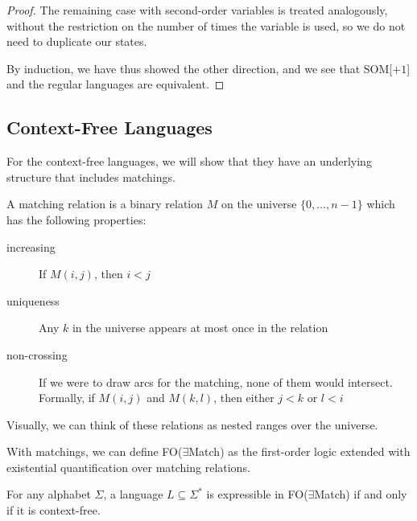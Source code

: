 \begin{proof}
    The remaining case with second-order variables is treated analogously, without the restriction on the number of times the variable is used, so we do not need to duplicate our states.

    By induction, we have thus showed the other direction, and we see that SOM[$+ 1$] and the regular languages are equivalent.
\end{proof}

\subsection{Context-Free Languages}\label{subsec:des-context-free-languages}

For the context-free languages, we will show that they have an underlying structure that includes matchings.

A matching relation is a binary relation $M$ on the universe $\{0, \dots, n - 1\}$ which has the following properties:
\begin{description}
    \item[increasing] If $M(i, j)$, then $i < j$
    \item[uniqueness] Any $k$ in the universe appears at most once in the relation
    \item[non-crossing] If we were to draw arcs for the matching, none of them would intersect.
    Formally, if $M(i, j)$ and $M(k, l)$, then either $j < k$ or $l < i$
\end{description}
Visually, we can think of these relations as nested ranges over the universe.

With matchings, we can define FO($\exists$Match) as the first-order logic extended with existential quantification over matching relations.

\begin{theorem}
    For any alphabet $\Sigma$, a language $L \subseteq \Sigma^{*}$ is expressible in FO($\exists$Match) if and only if it is context-free.
\end{theorem}


